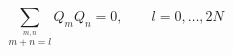 \begin{equation}
%
\sum_{\stackrel{\scriptstyle m, n}{m+n=l}}
Q_{m}Q_{n} = 0, \qquad l=0, \ldots ,2N
%
\end{equation}

